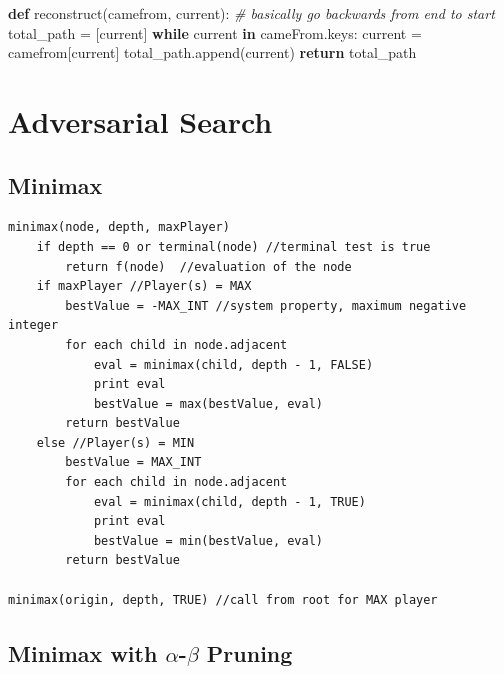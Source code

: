 \documentclass[12pt]{article}
\newenvironment{Shaded}{}{}
\newcommand{\KeywordTok}[1]{\textcolor[rgb]{0.00,0.44,0.13}{\textbf{{#1}}}}
\newcommand{\CommentTok}[1]{\textcolor[rgb]{0.38,0.63,0.69}{\textit{{#1}}}}
\newcommand{\NormalTok}[1]{{#1}}
\newcommand{\ControlFlowTok}[1]{\textcolor[rgb]{0.00,0.44,0.13}{\textbf{{#1}}}}
\newcommand{\OperatorTok}[1]{\textcolor[rgb]{0.40,0.40,0.40}{{#1}}}
\begin{document}
\begin{Shaded}
\begin{Highlighting}[]
\KeywordTok{def} \NormalTok{reconstruct(camefrom, current):}
  \CommentTok{# basically go backwards from end to start}
  \NormalTok{total_path }\OperatorTok{=} \NormalTok{[current]}
  \ControlFlowTok{while} \NormalTok{current }\KeywordTok{in} \NormalTok{cameFrom.keys:}
    \NormalTok{current }\OperatorTok{=} \NormalTok{camefrom[current]}
    \NormalTok{total_path.append(current)}
  \ControlFlowTok{return} \NormalTok{total_path}
\end{Highlighting}
\end{Shaded}

    \section{Adversarial Search}\label{adversarial-search}

    \subsection{Minimax}\label{minimax}

\begin{verbatim}
minimax(node, depth, maxPlayer)
    if depth == 0 or terminal(node) //terminal test is true
        return f(node)  //evaluation of the node
    if maxPlayer //Player(s) = MAX
        bestValue = -MAX_INT //system property, maximum negative integer
        for each child in node.adjacent
            eval = minimax(child, depth - 1, FALSE)
            print eval
            bestValue = max(bestValue, eval)
        return bestValue
    else //Player(s) = MIN
        bestValue = MAX_INT
        for each child in node.adjacent
            eval = minimax(child, depth - 1, TRUE)
            print eval
            bestValue = min(bestValue, eval)
        return bestValue

minimax(origin, depth, TRUE) //call from root for MAX player
\end{verbatim}

    \subsection{\texorpdfstring{Minimax with \(\alpha\)-\(\beta\)
Pruning}{Minimax with \textbackslash{}alpha-\textbackslash{}beta Pruning}}\label{minimax-with-alpha-beta-pruning}
\end{document}
